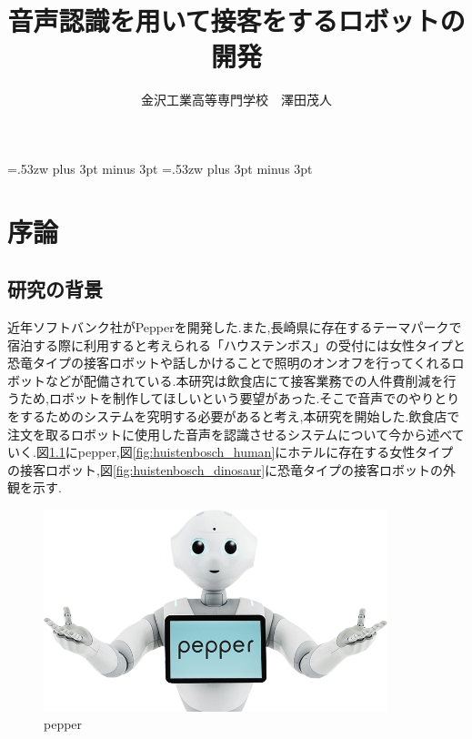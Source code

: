 \documentclass[12pt,oneside]{sotsuken_paper}
\begin{document}
\title{音声認識を用いて接客をするロボットの開発}

\author{金沢工業高等専門学校　澤田茂人}

\setlength{\baselineskip}{9truemm}

\kanJiskip=.53zw plus 3pt minus 3pt
\xkanJiskip=.53zw plus 3pt minus 3pt

\tableofcontents


\chapter{序論}
\section{研究の背景}
近年ソフトバンク社がPepperを開発した.また,長崎県に存在するテーマパークで宿泊する際に利用すると考えられる「ハウステンボス」の受付には女性タイプと恐竜タイプの接客ロボットや話しかけることで照明のオンオフを行ってくれるロボットなどが配備されている.本研究は飲食店にて接客業務での人件費削減を行うため,ロボットを制作してほしいという要望があった.そこで音声でのやりとりをするためのシステムを究明する必要があると考え,本研究を開始した.飲食店で注文を取るロボットに使用した音声を認識させるシステムについて今から述べていく.図\ref{fig:hospitality-robot}にpepper,図\ref{fig:huistenbosch_human}にホテルに存在する女性タイプの接客ロボット,図\ref{fig:huistenbosch_dinosaur}に恐竜タイプの接客ロボットの外観を示す.


\begin{figure}[htbp]
\begin{center}
\includegraphics[width=100mm]{img/pepper.png}
\caption{pepper}
\label{fig:hospitality-robot}
\end{center}
\end{figure}
\end{document}
